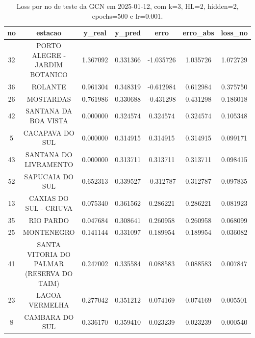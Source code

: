 \begin{table}[h]
\centering
\caption{Loss por no de teste da GCN em 2025-01-12, com k=3, HL=2, hidden=2, epochs=500 e lr=0.001.}
\label{tab:gcn_loss_k3_hl2_h2_e500_d20250112}
\begin{tabular}{ccccccc}
\toprule
no & estacao & y\_real & y\_pred & erro & erro\_abs & loss\_no \\
\midrule
32 & PORTO ALEGRE - JARDIM BOTANICO & 1.367092 & 0.331366 & -1.035726 & 1.035726 & 1.072729 \\
36 & ROLANTE & 0.961304 & 0.348319 & -0.612984 & 0.612984 & 0.375750 \\
26 & MOSTARDAS & 0.761986 & 0.330688 & -0.431298 & 0.431298 & 0.186018 \\
42 & SANTANA DA BOA VISTA & 0.000000 & 0.324574 & 0.324574 & 0.324574 & 0.105348 \\
5 & CACAPAVA DO SUL & 0.000000 & 0.314915 & 0.314915 & 0.314915 & 0.099171 \\
43 & SANTANA DO LIVRAMENTO & 0.000000 & 0.313711 & 0.313711 & 0.313711 & 0.098415 \\
52 & SAPUCAIA DO SUL & 0.652313 & 0.339527 & -0.312787 & 0.312787 & 0.097835 \\
13 & CAXIAS DO SUL - CRIUVA & 0.075340 & 0.361562 & 0.286221 & 0.286221 & 0.081923 \\
35 & RIO PARDO & 0.047684 & 0.308641 & 0.260958 & 0.260958 & 0.068099 \\
25 & MONTENEGRO & 0.141144 & 0.331097 & 0.189954 & 0.189954 & 0.036082 \\
41 & SANTA VITORIA DO PALMAR (RESERVA DO TAIM) & 0.247002 & 0.335584 & 0.088583 & 0.088583 & 0.007847 \\
23 & LAGOA VERMELHA & 0.277042 & 0.351212 & 0.074169 & 0.074169 & 0.005501 \\
8 & CAMBARA DO SUL & 0.336170 & 0.359410 & 0.023239 & 0.023239 & 0.000540 \\
\bottomrule
\end{tabular}
\end{table}
